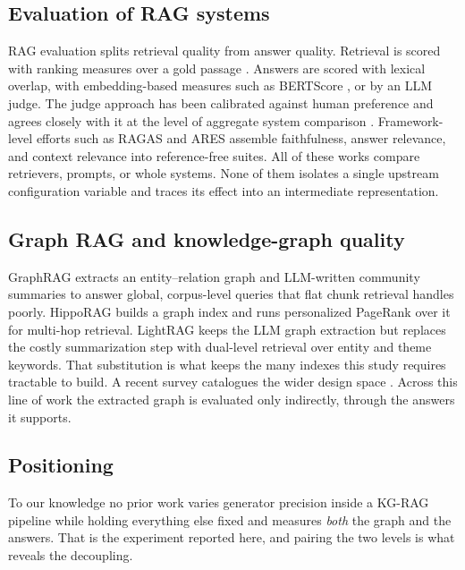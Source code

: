 \documentclass[conference, table]{IEEEtran}
\begin{document}
\subsection{Evaluation of RAG systems}

\noindent
RAG evaluation splits retrieval quality from answer quality. Retrieval is scored with ranking measures over a gold passage \cite{karpukhin2020}. Answers are scored with lexical overlap, with embedding-based measures such as BERTScore \cite{bertscore2020}, or by an LLM judge. The judge approach has been calibrated against human preference and agrees closely with it at the level of aggregate system comparison \cite{llmjudge2023}. Framework-level efforts such as RAGAS \cite{ragas2024} and ARES \cite{ares2024} assemble faithfulness, answer relevance, and context relevance into reference-free suites. All of these works compare retrievers, prompts, or whole systems. None of them isolates a single upstream configuration variable and traces its effect into an intermediate representation.

\subsection{Graph RAG and knowledge-graph quality}

\noindent
GraphRAG \cite{graphrag2024} extracts an entity--relation graph and LLM-written community summaries to answer global, corpus-level queries that flat chunk retrieval handles poorly. HippoRAG \cite{hipporag2024} builds a graph index and runs personalized PageRank over it for multi-hop retrieval. LightRAG \cite{lightrag2024} keeps the LLM graph extraction but replaces the costly summarization step with dual-level retrieval over entity and theme keywords. That substitution is what keeps the many indexes this study requires tractable to build. A recent survey catalogues the wider design space \cite{graphragsurvey2024}. Across this line of work the extracted graph is evaluated only indirectly, through the answers it supports.

\subsection{Positioning}

\noindent
To our knowledge no prior work varies generator precision inside a KG-RAG pipeline while holding everything else fixed and measures \emph{both} the graph and the answers. That is the experiment reported here, and pairing the two levels is what reveals the decoupling.
\end{document}
